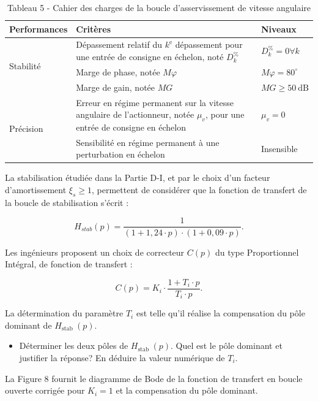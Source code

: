 \begin{table}[h]
\begin{center}
\begin{tabular}[t]{|l|l|l|}
\hline
Performances & Critères & Niveaux \\
\hline
\multirow[t]{3}{*}{Stabilité} & Dépassement relatif du $k^{\mathrm{e}}$ dépassement pour une entrée de consigne en échelon, noté $D_{k}^{\%}$ & $D_{k}^{\%}=0 \forall k$ \\
\hline
 & Marge de phase, notée $M \varphi$ & $M \varphi=80^{\circ}$ \\
\hline
 & Marge de gain, notée $M G$ & $M G \geqslant 50 \mathrm{~dB}$ \\
\hline
\multirow[t]{2}{*}{Précision} & Erreur en régime permanent sur la vitesse angulaire de l'actionneur, notée $\mu_{v}$, pour une entrée de consigne en échelon & $\mu_{v}=0$ \\
\hline
 & Sensibilité en régime permanent à une perturbation en échelon & Insensible \\
\hline
\end{tabular}
\captionsetup{labelformat=empty}
\caption{Tableau 5 - Cahier des charges de la boucle d'asservissement de vitesse angulaire}
\end{center}
\end{table}

La stabilisation étudiée dans la Partie D-I, et par le choix d'un facteur d'amortissement $\xi_{s} \geqslant 1$, permettent de considérer que la fonction de transfert de la boucle de stabilisation s'écrit :

$$
H_{s t a b}(p)=\frac{1}{(1+1,24 \cdot p) \cdot(1+0,09 \cdot p)} .
$$

Les ingénieurs proposent un choix de correcteur $C(p)$ du type Proportionnel Intégral, de fonction de transfert :

$$
C(p)=K_{i} \cdot \frac{1+T_{i} \cdot p}{T_{i} \cdot p} .
$$

La détermination du paramètre $T_{i}$ est telle qu'il réalise la compensation du pôle dominant de $H_{\text {stab }}(p)$.

\begin{itemize}
  \item[Q26.] Déterminer les deux pôles de $H_{\text {stab }}(p)$. Quel est le pôle dominant et justifier la réponse? En déduire la valeur numérique de $T_{i}$.
\end{itemize}

La Figure 8 fournit le diagramme de Bode de la fonction de transfert en boucle ouverte corrigée pour $K_{i}=1$ et la compensation du pôle dominant.

